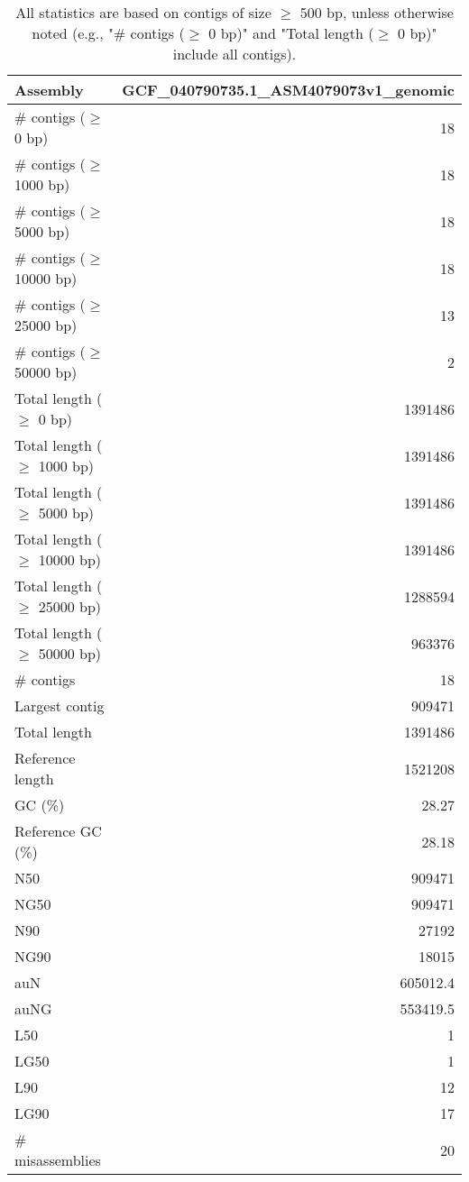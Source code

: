 \documentclass[12pt,a4paper]{article}
\begin{document}
\begin{table}[ht]
\begin{center}
\caption{All statistics are based on contigs of size $\geq$ 500 bp, unless otherwise noted (e.g., "\# contigs ($\geq$ 0 bp)" and "Total length ($\geq$ 0 bp)" include all contigs).}
\begin{tabular}{|l*{1}{|r}|}
\hline
Assembly & GCF\_040790735.1\_ASM4079073v1\_genomic \\ \hline
\# contigs ($\geq$ 0 bp) & 18 \\ \hline
\# contigs ($\geq$ 1000 bp) & 18 \\ \hline
\# contigs ($\geq$ 5000 bp) & 18 \\ \hline
\# contigs ($\geq$ 10000 bp) & 18 \\ \hline
\# contigs ($\geq$ 25000 bp) & 13 \\ \hline
\# contigs ($\geq$ 50000 bp) & 2 \\ \hline
Total length ($\geq$ 0 bp) & 1391486 \\ \hline
Total length ($\geq$ 1000 bp) & 1391486 \\ \hline
Total length ($\geq$ 5000 bp) & 1391486 \\ \hline
Total length ($\geq$ 10000 bp) & 1391486 \\ \hline
Total length ($\geq$ 25000 bp) & 1288594 \\ \hline
Total length ($\geq$ 50000 bp) & 963376 \\ \hline
\# contigs & 18 \\ \hline
Largest contig & 909471 \\ \hline
Total length & 1391486 \\ \hline
Reference length & 1521208 \\ \hline
GC (\%) & 28.27 \\ \hline
Reference GC (\%) & 28.18 \\ \hline
N50 & 909471 \\ \hline
NG50 & 909471 \\ \hline
N90 & 27192 \\ \hline
NG90 & 18015 \\ \hline
auN & 605012.4 \\ \hline
auNG & 553419.5 \\ \hline
L50 & 1 \\ \hline
LG50 & 1 \\ \hline
L90 & 12 \\ \hline
LG90 & 17 \\ \hline
\# misassemblies & 20 \\ \hline

\end{tabular}
\end{center}
\end{table}
\end{document}
